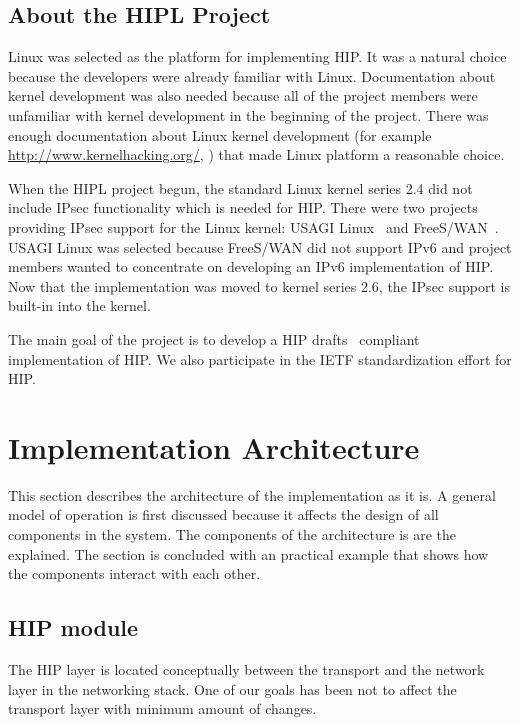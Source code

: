 \subsection{About the HIPL Project}

Linux was selected as the platform for implementing \ac{HIP}. It was a
natural choice because the developers were already familiar with
Linux. Documentation about kernel development was also needed because
all of the project members were unfamiliar with kernel development in
the beginning of the project. There was enough documentation about
Linux kernel development (for example
\url{http://www.kernelhacking.org/},
\cite{kernelarch,kernellinks,kmodguide,linuxtcpipstack,ldd}) that made
Linux platform a reasonable choice.

When the \ac{HIPL} project begun, the standard Linux kernel series 2.4
did not include \ac{IPsec} functionality which is needed for
\ac{HIP}. There were two projects providing \ac{IPsec} support for the
Linux kernel: USAGI Linux~\cite{usagi} and
FreeS/WAN~\cite{freeswan}. USAGI Linux was selected because FreeS/WAN
did not support IPv6 and project members wanted to concentrate on
developing an IPv6 implementation of \ac{HIP}. Now that the
implementation was moved to kernel series 2.6, the \ac{IPsec} support
is built-in into the kernel.

The main goal of the project is to develop a \ac{HIP}
drafts~\cite{hip,hiparch,hipimpl,hip-ietf-mm-00,rvs-00} compliant
implementation of \ac{HIP}. We also participate in the \ac{IETF}
standardization effort for \ac{HIP}.

\section{Implementation Architecture}
\label{sec:implementation_architecture}

This section describes the architecture of the implementation as it
is. A general model of operation is first discussed because it affects
the design of all components in the system. The components of the
architecture is are the explained. The section is concluded with an
practical example that shows how the components interact with each
other.

\subsection{HIP module}
\label{sec:kernel_model_architecture}

The HIP layer is located conceptually between the transport and the
network layer in the networking stack. One of our goals has been not
to affect the transport layer with minimum amount of changes.

